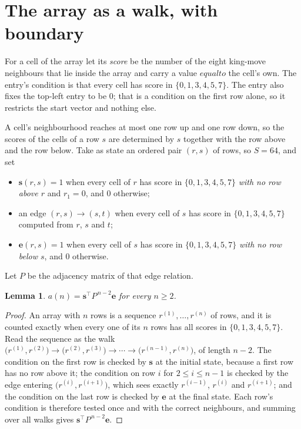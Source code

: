 \documentclass[11pt,a4paper]{article}
\theoremstyle{plain}
\newtheorem{lemma}[theorem]{Lemma}
\theoremstyle{definition}
\begin{document}
\section{The array as a walk, with boundary}

For a cell of the array let its \emph{score} be the number of the eight king-move neighbours that lie inside
the array and carry a value $equal to$ the cell's own. The entry's condition is that every cell
has score in $\{0,1,3,4,5,7\}$. The entry also fixes the top-left entry to be $0$; that is a condition on the first row alone, so it restricts the start vector and nothing else.

A cell's neighbourhood reaches at most one row up and one row down, so the scores of the
cells of a row $s$ are determined by $s$ together with the row above and the row below.
Take as state an ordered pair $(r,s)$ of rows, so $S=64$, and set
\begin{itemize}
\item $\mathbf{s}(r,s)=1$ when every cell of $r$ has score in $\{0,1,3,4,5,7\}$ \emph{with no row
above $r$} and $r_1=0$, and $0$ otherwise;
\item an edge $(r,s)\to(s,t)$ when every cell of $s$ has score in $\{0,1,3,4,5,7\}$ computed from
$r$, $s$ and $t$;
\item $\mathbf{e}(r,s)=1$ when every cell of $s$ has score in $\{0,1,3,4,5,7\}$ \emph{with no row
below $s$}, and $0$ otherwise.
\end{itemize}
Let $P$ be the adjacency matrix of that edge relation.

\begin{lemma}\label{lem:walk}
$a(n)=\mathbf{s}^{\!\top}P^{\,n-2}\mathbf{e}$ for every $n\ge2$.
\end{lemma}

\begin{proof}
An array with $n$ rows is a sequence $r^{(1)},\dots,r^{(n)}$ of rows, and it is counted
exactly when every one of its $n$ rows has all scores in $\{0,1,3,4,5,7\}$. Read the sequence as the
walk $\bigl(r^{(1)},r^{(2)}\bigr)\to\bigl(r^{(2)},r^{(3)}\bigr)\to\cdots\to
\bigl(r^{(n-1)},r^{(n)}\bigr)$, of length $n-2$. The condition on the first row is
checked by $\mathbf{s}$ at the initial state, because a first row has no row above it; the
condition on row $i$ for $2\le i\le n-1$ is checked by the edge entering
$\bigl(r^{(i)},r^{(i+1)}\bigr)$, which sees exactly $r^{(i-1)}$, $r^{(i)}$ and
$r^{(i+1)}$; and the condition on the last row is checked by $\mathbf{e}$ at the final
state. Each row's condition is therefore tested once and with the correct neighbours, and
summing over all walks gives $\mathbf{s}^{\!\top}P^{\,n-2}\mathbf{e}$.
\end{proof}
\end{document}

